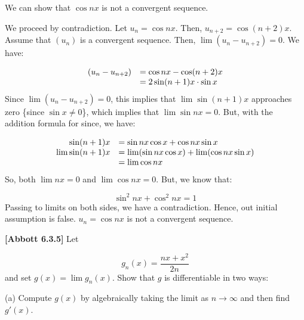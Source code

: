 \documentclass[10pt]{article}
\begin{document}
We can show that $\displaystyle \cos nx$ is not a convergent sequence. 



We proceed by contradiction. Let $\displaystyle u_{n} =\cos nx$. Then, $\displaystyle u_{n+2} =\cos( n+2) x$. Assume that $\displaystyle ( u_{n})$ is a convergent sequence. Then, $\displaystyle \lim ( u_{n} -u_{n+2}) =0$. We have:


\begin{equation*}
\begin{array}{ c l }
( u_{n} -u_{n+2}) & =\cos nx-\cos( n+2) x\\
 & =2\sin( n+1) x\cdot \sin x
\end{array}
\end{equation*}
Since $\displaystyle \lim ( u_{n} -u_{n+2}) =0$, this implies that $\displaystyle \lim \sin( n+1) x$ approaches zero \{since $\displaystyle \sin x\neq 0$\}, which implies that $\displaystyle \lim \sin nx=0$. But, with the addition formula for since, we have:


\begin{equation*}
\begin{array}{ r l }
\sin( n+1) x & =\sin nx\cos x+\cos nx\sin x\\
\lim \sin( n+1) x & =\lim (\sin nx\cos x) +\lim (\cos nx\sin x)\\
 & =\lim \cos nx
\end{array}
\end{equation*}
So, both $\displaystyle \lim nx=0$ and $\displaystyle \lim \cos nx=0$. But, we know that:


\begin{equation*}
\sin^{2} nx+\cos^{2} nx=1
\end{equation*}
Passing to limits on both sides, we have a contradiction. Hence, out initial assumption is false. $\displaystyle u_{n} =\cos nx$ is not a convergent sequence. 



\textbf{[Abbott 6.3.5] }Let 


\begin{equation*}
g_{n}( x) =\frac{nx+x^{2}}{2n}
\end{equation*}
and set $\displaystyle g( x) =\lim g_{n}( x)$. Show that $\displaystyle g$ is differentiable in two ways:



(a) Compute $\displaystyle g( x)$ by algebraically taking the limit as $\displaystyle n\rightarrow \infty $ and then find $\displaystyle g'( x)$. 
\end{document}

